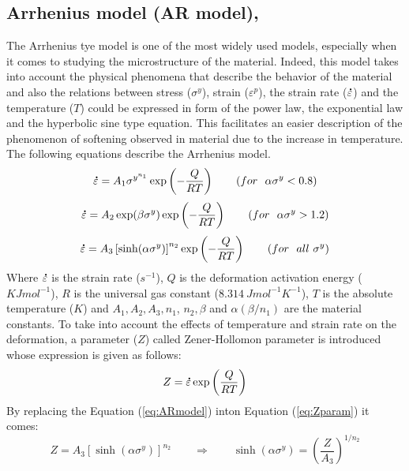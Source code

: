 \documentclass[twoside,english,1p,final,sort&compress]{elsarticle}
\theoremstyle{plain}
\newcommand{\mdot}[1]{\accentset{\mbox{\bfseries .}}{#1}}
\begin{document}
\subsection{Arrhenius model (AR model), \label{sec:ARmodel}}
The Arrhenius tye model is one of the most widely used models, especially when it comes to studying the microstructure of the material. Indeed, this model takes into account the physical phenomena that describe the behavior of the material and also the relations between stress ($\sigma^y$), strain ($\varepsilon^p$), the strain rate ($\mdot\varepsilon$) and the temperature ($T$) could be expressed in form of the power law, the exponential law and the hyperbolic sine type equation. This facilitates an easier description of the phenomenon of softening observed in material due to the increase in temperature. The following equations describe the Arrhenius model.
\begin{equation}
\label{eq:ARmodel1}
\mdot\varepsilon = A_1\sigma^{y^{n_1}}\exp\left(-\frac{Q}{RT}\right) \qquad (for ~~\alpha\sigma^y < 0.8)
\end{equation}
\begin{equation}
\label{eq:ARmodel2}
\mdot\varepsilon = A_2\exp(\beta\sigma^y)\exp\left(-\frac{Q}{RT}\right) \qquad (for ~~\alpha\sigma^y > 1.2)
\end{equation}
\begin{equation}
\label{eq:ARmodel}
\mdot\varepsilon = A_3\left[\sinh(\alpha\sigma^y)\right]^{n_2}\exp\left(-\frac{Q}{RT}\right) \qquad (for ~~all\ \sigma^y)
\end{equation}
Where $\mdot\varepsilon$ is the strain rate ($s^{-1}$), $Q$ is the deformation activation energy ($KJmol^{-1}$), $R$ is the universal gas constant ($8.314\ J mol^{-1} K^{-1}$), $T$ is the absolute temperature ($K$) and $A_1, A_2, A_3, n_1$, $n_2, \beta$ and $\alpha(\beta/n_1)$ are the material constants. To take into account the effects of temperature and strain rate on the deformation, a parameter ($Z$) called Zener-Hollomon parameter is introduced whose expression is given as follows:
\begin{equation}
\label{eq:Zparam}
Z = \mdot\varepsilon\exp\left(\frac{Q}{RT}\right)
\end{equation}
By replacing the Equation (\ref{eq:ARmodel}) inton Equation (\ref{eq:Zparam}) it comes:
\begin{equation}
\label{eq:Zparam1}
Z = A_3\left[\sinh(\alpha\sigma^y)\right]^{n_2} \qquad \Rightarrow \qquad \sinh(\alpha\sigma^y) = \left(\frac{Z}{A_3}\right)^{1/n_2}
\end{equation}
\end{document}

